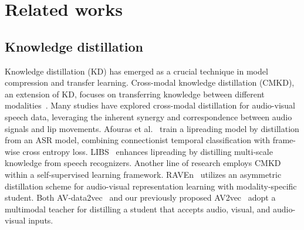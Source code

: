 \section{Related works}
\subsection{Knowledge distillation}
Knowledge distillation (KD) has emerged as a crucial technique in model compression and transfer learning.
Cross-modal knowledge distillation (CMKD), an extension of KD, focuses on transferring knowledge between different modalities~\cite{10643687}.
Many studies have explored cross-modal distillation for audio-visual speech data, leveraging the inherent synergy and correspondence between audio signals and lip movements. 
Afouras et al.~\cite{afouras2020asr} train a lipreading model by distillation from an ASR model, combining connectionist temporal classification with frame-wise cross entropy loss. 
LIBS~\cite{zhao2020hearing} enhances lipreading by distilling multi-scale knowledge from speech recognizers. 
Another line of research employs CMKD within a self-supervised learning framework. 
RAVEn~\cite{haliassos2022jointly} utilizes an asymmetric distillation scheme for audio-visual representation learning with modality-specific student. 
Both AV-data2vec~\cite{Lian2023avdata2vec} and our previously proposed AV2vec~\cite{Zhang2023av2vec} adopt a multimodal teacher for distilling a student that accepts audio, visual, and audio-visual inputs.

